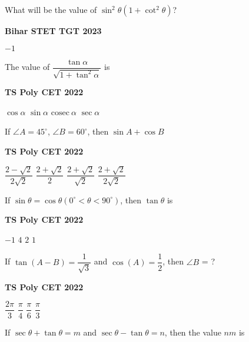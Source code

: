 \documentclass[11pt,paper=a4,answers]{exam}
\begin{document}
\begin{multicols}{2}
\begin{questions}
\columnbreak
\question What will be the value of  $\sin^2 \theta \left(1+\cot^2 \theta \right)$?

\begin{flushright}
\small\textbf{Bihar STET TGT 2023}
\end{flushright}


\begin{choices}
\choice $-1$
\end{choices}
\question The value of $\displaystyle \dfrac{\tan \alpha}{\sqrt{1+ \tan^2 \alpha} }  $ is
\begin{flushright}
\small\textbf{TS Poly CET 2022}
\end{flushright}


\begin{choices}
\choice $\displaystyle \cos \alpha$
\choice $\displaystyle \sin \alpha$
\choice $\displaystyle \textrm{cosec} \ \alpha$ 
\choice $\displaystyle \sec \alpha$
\end{choices}


\question If $\angle A=45^{\circ}$, $\angle B=60^{\circ}$, then $\sin A + \cos B$
\begin{flushright}
\small\textbf{TS Poly CET 2022}
\end{flushright}
\begin{choices}
\choice $\displaystyle \dfrac{2-\sqrt{2}}{2\sqrt{2}}$
\choice $\displaystyle \dfrac{2+\sqrt{2}}{{2}}$
\choice $\displaystyle \dfrac{2+\sqrt{2}}{\sqrt{2}}$
\choice $\displaystyle \dfrac{2+\sqrt{2}}{2\sqrt{2}}$
\end{choices}
\question 
If $\sin  \theta = \cos \theta \left(0^{\circ} < \theta < 90^{\circ}  \right)$, then $\tan \theta$ is
\begin{flushright}
\small\textbf{TS Poly CET 2022}
\end{flushright}


\begin{choices}
\choice $\displaystyle -1$ 
\choice $\displaystyle 4$ 
\choice $\displaystyle 2$ 
\choice $\displaystyle 1$  
\end{choices}
\columnbreak
\question If $\displaystyle \tan  \left(A-B \right) = \dfrac{1}{\sqrt{3}}$ and $\displaystyle \cos  \left(A \right) = \dfrac{1}{2}$, then $\angle B $ = ?
\begin{flushright}
\small\textbf{TS Poly CET 2022}
\end{flushright}

\begin{choices}
\choice $\displaystyle \dfrac{2 \pi }{3}$ 
\choice $\displaystyle \dfrac{\pi}{4}$
\choice $\displaystyle \dfrac{\pi}{6}$
 \choice $\displaystyle \dfrac{\pi}{3}$  
\end{choices}
\question If $\sec \theta + \tan  \theta = m$ and $\sec \theta - \tan  \theta = n$, then the value $nm$ is


\end{questions}
\end{multicols}
\end{document}
